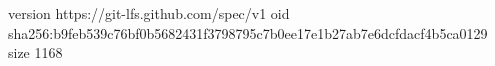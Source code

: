 version https://git-lfs.github.com/spec/v1
oid sha256:b9feb539c76bf0b5682431f3798795c7b0ee17e1b27ab7e6dcfdacf4b5ca0129
size 1168

